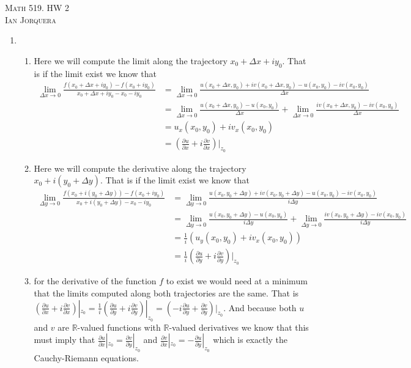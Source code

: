 \documentclass[12pt]{amsart}
\theoremstyle{definition}
\newcommand{\R}{\mathbb{R}}
\newcommand{\ra}{\rightarrow}
\begin{document}
\begin{center}
    \textsc{Math 519. HW 2\\ Ian Jorquera}
\end{center}
\vspace{1em}

\begin{enumerate}

\item 
\begin{enumerate}[label=(\alph*)]
    \item Here we will compute the limit along the trajectory $x_0+\Delta x+iy_0$. That is if the limit exist we know that 
    \begin{align*}
        \lim_{\Delta x\ra 0}\frac{f(x_0+\Delta x+iy_0)-f(x_0+iy_0)}{x_0+\Delta x+iy_0-x_0-iy_0}&=\lim_{\Delta x\ra 0}\frac{u(x_0+\Delta x,y_0)+iv(x_0+\Delta x,y_0)-u(x_0,y_0)-iv(x_0,y_0)}{\Delta x}\\
        &=\lim_{\Delta x\ra 0}\frac{u(x_0+\Delta x,y_0)-u(x_0,y_0)}{\Delta x}+\lim_{\Delta x\ra 0}\frac{iv(x_0+\Delta x,y_0)-iv(x_0,y_0)}{\Delta x}\\
        &=u_x(x_0,y_0)+iv_x(x_0,y_0)\\
        &=\left(\frac{\partial u}{\partial x}+i\frac{\partial v}{\partial x}\right)|_{z_0}
    \end{align*}
    \item  Here we will compute the derivative along the trajectory $x_0+i(y_0+\Delta y)$. That is if the limit exist we know that 
    \begin{align*}
        \lim_{\Delta y\ra 0}\frac{f(x_0+i(y_0+\Delta y))-f(x_0+iy_0)}{x_0+i(y_0+\Delta y)-x_0-iy_0}&=\lim_{\Delta y\ra 0}\frac{u(x_0,y_0+\Delta y)+iv(x_0,y_0+\Delta y)-u(x_0,y_0)-iv(x_0,y_0)}{i\Delta y}\\
        &=\lim_{\Delta y\ra 0}\frac{u(x_0,y_0+\Delta y)-u(x_0,y_0)}{i\Delta y}+\lim_{\Delta y\ra 0}\frac{iv(x_0,y_0+\Delta y)-iv(x_0,y_0)}{i\Delta y}\\
        &=\frac{1}{i}(u_y(x_0,y_0)+iv_x(x_0,y_0))\\
        &=\frac{1}{i}\left(\frac{\partial u}{\partial y}+i\frac{\partial v}{\partial y}\right)|_{z_0}
    \end{align*}
    \item for the derivative of the function $f$ to exist we would need at a minimum that the limits computed along both trajectories are the same. That is $\left(\frac{\partial u}{\partial x}+i\frac{\partial v}{\partial x}\right)|_{z_0}=\frac{1}{i}\left(\frac{\partial u}{\partial y}+i\frac{\partial v}{\partial y}\right)|_{z_0}=\left(-i\frac{\partial u}{\partial y}+\frac{\partial v}{\partial y}\right)|_{z_0}$. And because both $u$ and $v$ are $\R$-valued functions with $\R$-valued derivatives we know that this must imply that $\frac{\partial u}{\partial x}|_{z_0}=\frac{\partial v}{\partial y}|_{z_0}$ and $\frac{\partial v}{\partial x}|_{z_0}=-\frac{\partial u}{\partial y}|_{z_0}$ which is exactly the Cauchy-Riemann equations.\\
\end{enumerate}


\end{enumerate}
\end{document}
